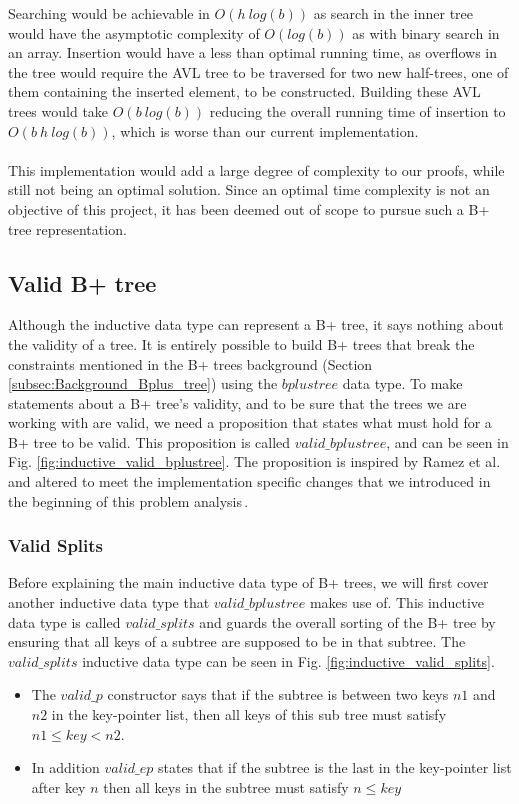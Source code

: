 Searching would be achievable in $O(h~log(b))$ as search in the inner tree would have the asymptotic complexity of $O(log(b))$ as with binary search in an array. Insertion would have a less than optimal running time, as overflows in the tree would require the AVL tree to be traversed for two new half-trees, one of them containing the inserted element, to be constructed. Building these AVL trees would take $O(b~log(b))$ reducing the overall running time of insertion to $O(b~h~log(b))$, which is worse than our current implementation.
\paragraph{}
This implementation would add a large degree of complexity to our proofs, while still not being an optimal solution. Since an optimal time complexity is not an objective of this project, it has been deemed out of scope to pursue such a B+ tree representation.


\subsection{Valid B+ tree}
\label{subsec:Valid_bplustree}
Although the inductive data type can represent a B+ tree, it says nothing about the validity of a tree. It is entirely possible to build B+ trees that break the constraints mentioned in the B+ trees background (Section \ref{subsec:Background_Bplus_tree}) using the $bplustree$ data type. To make statements about a B+ tree's validity, and to be sure that the trees we are working with are valid, we need a proposition that states what must hold for a B+ tree to be valid. This proposition is called $valid\_bplustree$, and can be seen in Fig. \ref{fig:inductive_valid_bplustree}. The proposition is inspired by Ramez et al. and altered to meet the implementation specific changes that we introduced in the beginning of this problem analysis\,\cite[pp. 652]{Elmasri1999}. 
\subsubsection{Valid Splits}
Before explaining the main inductive data type of B+ trees, we will first cover another inductive data type that $valid\_bplustree$ makes use of. This inductive data type is called $valid\_splits$ and guards the overall sorting of the B+ tree by ensuring that all keys of a subtree are supposed to be in that subtree. The $valid\_splits$ inductive data type can be seen in Fig. \ref{fig:inductive_valid_splits}.
\begin{itemize}
	\item The $valid\_p$ constructor says that if the subtree is between two keys $n1$ and $n2$ in the key-pointer list, then all keys of this sub tree must satisfy $n1 \leq key < n2$. 
	\item In addition $valid\_ep$ states that if the subtree is the last in the key-pointer list after key $n$ then all keys in the subtree must satisfy $n \leq key$
\end{itemize} 

